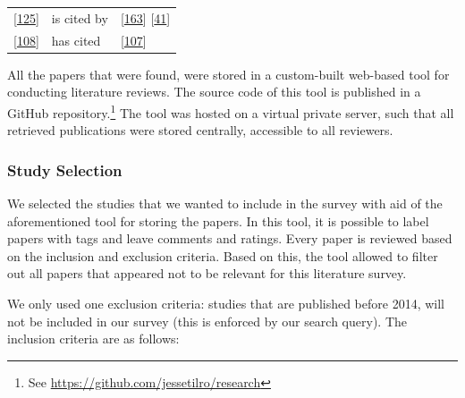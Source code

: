 \documentclass[]{book}
\let\rmarkdownfootnote\footnote%
\def\footnote{\protect\rmarkdownfootnote}
\begin{document}
\begin{longtable}[]{@{}lll@{}}
\begin{minipage}[t]{0.23\columnwidth}\raggedright\strut
{[}\protect\hyperlink{ref-mantyla2015a}{125}{]}\strut
\end{minipage} & \begin{minipage}[t]{0.18\columnwidth}\raggedright\strut
is cited by\strut
\end{minipage} & \begin{minipage}[t]{0.25\columnwidth}\raggedright\strut
{[}\protect\hyperlink{ref-rodriguez2017a}{163}{]}
{[}\protect\hyperlink{ref-cesar2017a}{41}{]}\strut
\end{minipage}\tabularnewline
\begin{minipage}[t]{0.23\columnwidth}\raggedright\strut
{[}\protect\hyperlink{ref-laukkanen2018a}{108}{]}\strut
\end{minipage} & \begin{minipage}[t]{0.18\columnwidth}\raggedright\strut
has cited\strut
\end{minipage} & \begin{minipage}[t]{0.25\columnwidth}\raggedright\strut
{[}\protect\hyperlink{ref-laukkanen2017a}{107}{]}\strut
\end{minipage}\tabularnewline
\bottomrule
\end{longtable}

All the papers that were found, were stored in a custom-built web-based
tool for conducting literature reviews. The source code of this tool is
published in a GitHub repository.\footnote{See
  \url{https://github.com/jessetilro/research}} The tool was hosted on a
virtual private server, such that all retrieved publications were stored
centrally, accessible to all reviewers.

\subsubsection{Study Selection}\label{study-selection}

We selected the studies that we wanted to include in the survey with aid
of the aforementioned tool for storing the papers. In this tool, it is
possible to label papers with tags and leave comments and ratings. Every
paper is reviewed based on the inclusion and exclusion criteria. Based
on this, the tool allowed to filter out all papers that appeared not to
be relevant for this literature survey.

We only used one exclusion criteria: studies that are published before
2014, will not be included in our survey (this is enforced by our search
query). The inclusion criteria are as follows:
\end{document}
